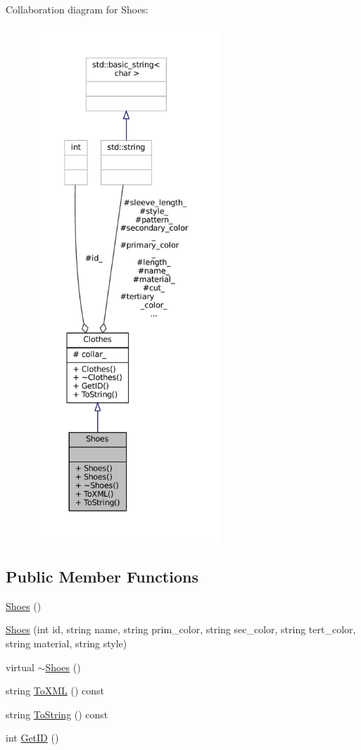 Collaboration diagram for Shoes\+:\nopagebreak
\begin{figure}[H]
\begin{center}
\leavevmode
\includegraphics[height=550pt]{classShoes__coll__graph}
\end{center}
\end{figure}
\subsection*{Public Member Functions}
\begin{DoxyCompactItemize}
\item 
\mbox{\hyperlink{classShoes_af27b3cc545cf835d7a2eb5817347506a}{Shoes}} ()
\item 
\mbox{\hyperlink{classShoes_a4f38fcd11c63cf3256c9688cf1bd19b3}{Shoes}} (int id, string name, string prim\+\_\+color, string sec\+\_\+color, string tert\+\_\+color, string material, string style)
\item 
virtual \mbox{\hyperlink{classShoes_afc511aaebac8e7ab57286cf35db7ce8f}{$\sim$\+Shoes}} ()
\item 
string \mbox{\hyperlink{classShoes_acf6f049aa995a189b0f892f86defeefd}{To\+X\+ML}} () const
\item 
string \mbox{\hyperlink{classShoes_a9b1bcc00ec7ef920d34bf9193c96a1ce}{To\+String}} () const
\item 
int \mbox{\hyperlink{classClothes_a3f6dac172f333126d19010f85ec44e4c}{Get\+ID}} ()
\end{DoxyCompactItemize}
